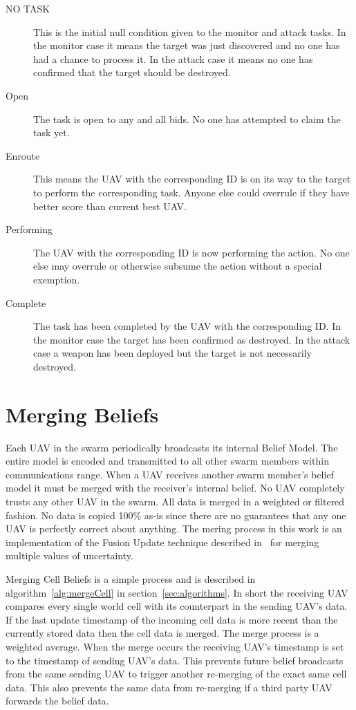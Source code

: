 \begin{multicols}{2}
\begin{description}
	\item [NO TASK] This is the initial null condition given to the monitor and attack tasks.  In the monitor case it means the target was just discovered and no one has had a chance to process it.  In the attack case it means no one has confirmed that the target should be destroyed.
	\item [Open] The task is open to any and all bids.  No one has attempted to claim the task yet.
	\item [Enroute] This means the UAV with the corresponding ID is on its way to the target to perform the corresponding task.  Anyone else could overrule if they have better score than current best UAV.
	\item [Performing] The UAV with the corresponding ID is now performing the action.  No one else may overrule or otherwise subsume the action without a special exemption.%
	\item [Complete] The task has been completed by the UAV with the corresponding ID.  In the monitor case the target has been confirmed as destroyed.  In the attack case a weapon has been deployed but the target is not necessarily destroyed.
\end{description}

\section{Merging Beliefs}
Each UAV in the swarm periodically broadcasts its internal Belief Model.  The entire model is encoded and transmitted to all other swarm members within communications range.  When a UAV receives another swarm member's belief model it must be merged with the receiver's internal belief.  No UAV completely trusts any other UAV in the swarm.  All data is merged in a weighted or filtered fashion.  No data is copied 100\% as-is since there are no guarantees that any one UAV is perfectly correct about anything.  The mering process in this work is an implementation of the Fusion Update technique described in~\cite{shem} for merging multiple values of uncertainty.


Merging Cell Beliefs is a simple process and is described in algorithm~\ref{alg:mergeCell} in section~\ref{sec:algorithms}.   In short the receiving UAV compares every single world cell with its counterpart in the sending UAV's data.  If the last update timestamp of the incoming cell data is more recent than the currently stored data then the cell data is merged.  The merge process is a weighted average.  When the merge occurs the receiving UAV's timestamp is set to the timestamp of sending UAV's data.  This prevents future belief broadcasts from the same sending UAV to trigger another re-merging of the exact same cell data.  This also prevents the same data from re-merging if a third party UAV forwards the belief data. 


\end{multicols}
